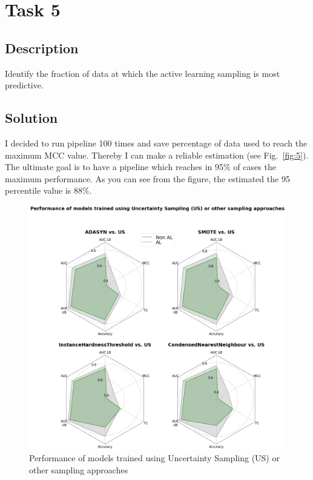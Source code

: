 \documentclass[a4paper,10pt]{article}
\begin{document}
\section{Task 5}


\subsection{Description}
Identify the fraction of data at which the active learning sampling is most predictive.
\subsection{Solution}
I decided to run pipeline 100 times and save percentage of data used to reach the maximum MCC value. Thereby I can make a reliable estimation (see Fig.~\ref{fig:5}). The ultimate goal is to have a pipeline which reaches in 95\% of cases the maximum performance. As you can see from the figure, the estimated the 95 percentile value is 88\%.




\medskip







\begin{figure}
    \centering
    \includegraphics[keepaspectratio=true, scale=0.32]{images/sampling_imbalanced_learn.png}
    \caption{Performance of models trained using Uncertainty Sampling (US) or other sampling approaches}
    \label{fig:1}
\end{figure}
\end{document}
